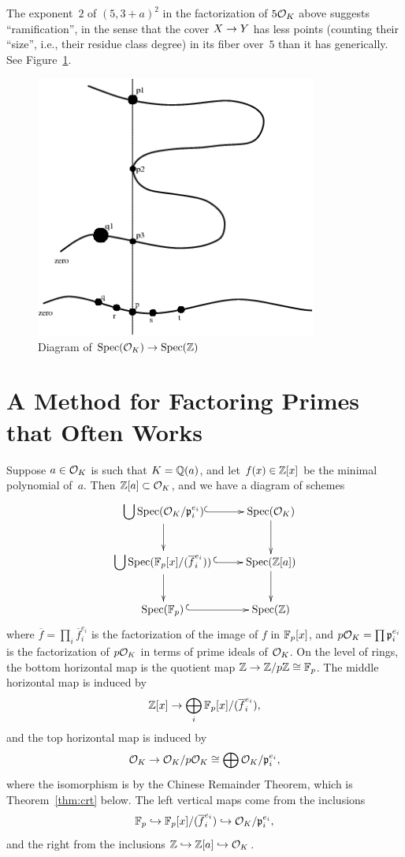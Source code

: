 The exponent~$2$ of $(5,3+a)^2$ in the factorization of $5\mathcal{O}_K$ above
suggests ``ramification'',
in the sense that the cover $X\rightarrow Y$ has less points (counting their ``size'', i.e.,
their residue class degree) in its fiber over~$5$ than
it has generically.
See Figure~\ref{fig:O_KoverSpecZ}.


\begin{figure}
\centering
\includegraphics[width=25em]{cover1}
\caption{Diagram of $\operatorname{Spec}(\mathcal{O}_K) \rightarrow \operatorname{Spec}(\mathbb{Z})$}
\label{fig:O_KoverSpecZ}
\end{figure}


\section{A Method for Factoring Primes that Often Works}
Suppose $a\in\mathcal{O}_K$ is such that $K=\mathbb{Q}(a)$, and let
$f(x)\in\mathbb{Z}[x]$ be the minimal polynomial of~$a$.  Then
$\mathbb{Z}[a]\subset \mathcal{O}_K$, and we have a diagram of schemes
$$\xymatrix{
  {{\ds \bigcup}\Spec(\O_K/\p_i^{e_i})}\ar@{^(->}[r]\ar[d]               &{\Spec(\O_K)}\ar[d]  \\
{{\ds \bigcup}\Spec(\F_p[x]/(\overline{f}_i^{e_i}))\,}\ar@{^(->}[r] \ar[d]
         &{\Spec(\Z[a])}\ar[d] \\%
{\Spec(\F_p)\,}\ar@{^(->}[r]&{\Spec(\Z)}
}$$
where $\overline{f} = \prod_i \overline{f}_i^{e_i}$
is the factorization of the image of $f$ in $\mathbb{F}_p[x]$,
and $p\mathcal{O}_K = \prod \mathfrak{p}_i^{e_i}$ is the factorization
of $p\mathcal{O}_K$ in terms of prime ideals of $\mathcal{O}_K$.
On the level of rings, the bottom horizontal map
is the quotient map $\mathbb{Z}\to\mathbb{Z}/p\mathbb{Z}\cong \mathbb{F}_p$.
The middle horizontal map is induced by
$$
  \mathbb{Z}[x] \to \bigoplus_i \mathbb{F}_p[x]/(\overline{f}_i^{e_i}),
$$
and the top horizontal map is induced by
$$
  \mathcal{O}_K \to \mathcal{O}_K/p\mathcal{O}_K \cong \bigoplus \mathcal{O}_K/\mathfrak{p}_i^{e_i},
$$
where the isomorphism is by the Chinese Remainder Theorem,
which is Theorem~\ref{thm:crt} below.
The left vertical maps come from the inclusions
$$
   \mathbb{F}_p \hookrightarrow \mathbb{F}_p[x]/(\overline{f}_i^{e_i}) \hookrightarrow \mathcal{O}_K/\mathfrak{p}_i^{e_i},
$$
and the right from the inclusions $\mathbb{Z}\hookrightarrow\mathbb{Z}[a]\hookrightarrow\mathcal{O}_K$.

